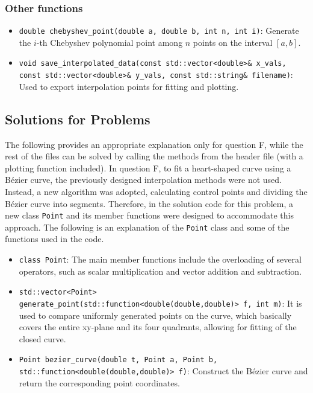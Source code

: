\documentclass[a4paper]{article}
\begin{document}
\subsubsection*{Other functions}
\begin{itemize}
    \item \verb|double chebyshev_point(double a, double b, int n, int i)|:
    Generate the \( i \)-th Chebyshev polynomial point among \( n \) points on the interval \([a, b]\).
    \item \verb|void save_interpolated_data(const std::vector<double>& x_vals, const std::vector<double>& y_vals, const std::string& filename)|:
    Used to export interpolation points for fitting and plotting.
\end{itemize}

\subsection*{Solutions for Problems}

The following provides an appropriate explanation only for question F, while the rest of the files can be solved by calling the methods from the header file (with a plotting function included).
In question F, to fit a heart-shaped curve using a Bézier curve, the previously designed interpolation methods were not used. 
Instead, a new algorithm was adopted, calculating control points and dividing the Bézier curve into segments. 
Therefore, in the solution code for this problem, a new class \verb|Point| and its member functions were designed to accommodate this approach. 
The following is an explanation of the \verb|Point| class and some of the functions used in the code.

\begin{itemize}
    \item \verb|class Point|:
    The main member functions include the overloading of several operators, such as scalar multiplication and vector addition and subtraction.
    \item \verb|std::vector<Point> generate_point(std::function<double(double,double)> f, int m)|:
    It is used to compare uniformly generated points on the curve, which basically covers the entire xy-plane and its four quadrants, allowing for fitting of the closed curve.
    \item \verb|Point bezier_curve(double t, Point a, Point b, std::function<double(double,double)> f)|: 
    Construct the Bézier curve and return the corresponding point coordinates.
\end{itemize}
\end{document}

